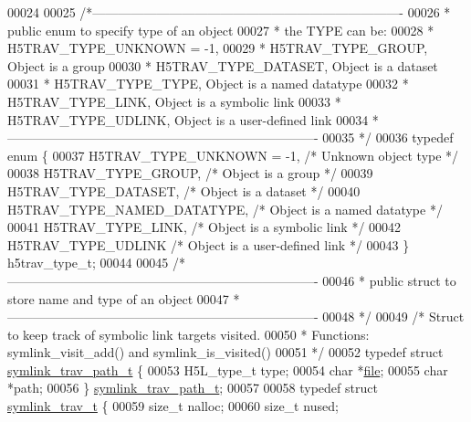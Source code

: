 \begin{DoxyCode}
00024 
00025 \textcolor{comment}{/*-------------------------------------------------------------------------}
00026 \textcolor{comment}{ * public enum to specify type of an object}
00027 \textcolor{comment}{ * the TYPE can be:}
00028 \textcolor{comment}{ *    H5TRAV\_TYPE\_UNKNOWN = -1,}
00029 \textcolor{comment}{ *    H5TRAV\_TYPE\_GROUP,            Object is a group}
00030 \textcolor{comment}{ *    H5TRAV\_TYPE\_DATASET,          Object is a dataset}
00031 \textcolor{comment}{ *    H5TRAV\_TYPE\_TYPE,             Object is a named datatype}
00032 \textcolor{comment}{ *    H5TRAV\_TYPE\_LINK,             Object is a symbolic link}
00033 \textcolor{comment}{ *    H5TRAV\_TYPE\_UDLINK,           Object is a user-defined link}
00034 \textcolor{comment}{ *-------------------------------------------------------------------------}
00035 \textcolor{comment}{ */}
00036 \textcolor{keyword}{typedef} \textcolor{keyword}{enum} \{
00037     H5TRAV\_TYPE\_UNKNOWN = -1,        \textcolor{comment}{/* Unknown object type */}
00038     H5TRAV\_TYPE\_GROUP,          \textcolor{comment}{/* Object is a group */}
00039     H5TRAV\_TYPE\_DATASET,        \textcolor{comment}{/* Object is a dataset */}
00040     H5TRAV\_TYPE\_NAMED\_DATATYPE, \textcolor{comment}{/* Object is a named datatype */}
00041     H5TRAV\_TYPE\_LINK,           \textcolor{comment}{/* Object is a symbolic link */}
00042     H5TRAV\_TYPE\_UDLINK          \textcolor{comment}{/* Object is a user-defined link */}
00043 \} h5trav\_type\_t;
00044 
00045 \textcolor{comment}{/*-------------------------------------------------------------------------}
00046 \textcolor{comment}{ * public struct to store name and type of an object}
00047 \textcolor{comment}{ *-------------------------------------------------------------------------}
00048 \textcolor{comment}{ */}
00049 \textcolor{comment}{/* Struct to keep track of symbolic link targets visited.}
00050 \textcolor{comment}{ * Functions: symlink\_visit\_add() and symlink\_is\_visited()}
00051 \textcolor{comment}{ */}
00052 \textcolor{keyword}{typedef} \textcolor{keyword}{struct }\hyperlink{structsymlink__trav__path__t}{symlink\_trav\_path\_t} \{
00053     H5L\_type\_t  type;
00054     \textcolor{keywordtype}{char} *\hyperlink{structfile}{file};
00055     \textcolor{keywordtype}{char} *path;
00056 \} \hyperlink{structsymlink__trav__path__t}{symlink\_trav\_path\_t};
00057 
00058 \textcolor{keyword}{typedef} \textcolor{keyword}{struct }\hyperlink{structsymlink__trav__t}{symlink\_trav\_t} \{
00059     \textcolor{keywordtype}{size\_t}      nalloc;
00060     \textcolor{keywordtype}{size\_t}      nused;

\end{DoxyCode}
